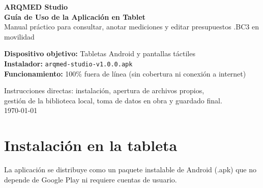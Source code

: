 \documentclass[11pt,a4paper]{article}
\begin{document}
\begin{titlepage}
    \centering
    \vspace*{1.5cm}
    
    {\Huge \textbf{\color{arqmedDark}ARQMED Studio}}\\[0.4cm]
    {\LARGE \textbf{\color{arqmedAmber}Guía de Uso de la Aplicación en Tablet}}\\[0.4cm]
    {\large Manual práctico para consultar, anotar mediciones y editar presupuestos .BC3 en movilidad}\\
    
    \vspace{2cm}
    
    \begin{tcolorbox}[colback=arqmedLight,colframe=arqmedDark,arc=3mm,width=0.9\textwidth,center]
        \centering
        \vspace{0.3cm}
        \textbf{Dispositivo objetivo:} Tabletas Android y pantallas táctiles\\
        \textbf{Instalador:} \texttt{arqmed-studio-v1.0.0.apk}\\
        \textbf{Funcionamiento:} 100\% fuera de línea (sin cobertura ni conexión a internet)\\
        \vspace{0.3cm}
    \end{tcolorbox}
    
    \vfill
    
    {\color{arqmedMuted}
    Instrucciones directas: instalación, apertura de archivos propios,\\
    gestión de la biblioteca local, toma de datos en obra y guardado final.\\[0.5cm]
    \today
    }
\end{titlepage}

\tableofcontents
\newpage

\section{Instalación en la tableta}

La aplicación se distribuye como un paquete instalable de Android (.apk) que no depende de Google Play ni requiere cuentas de usuario.
\end{document}

